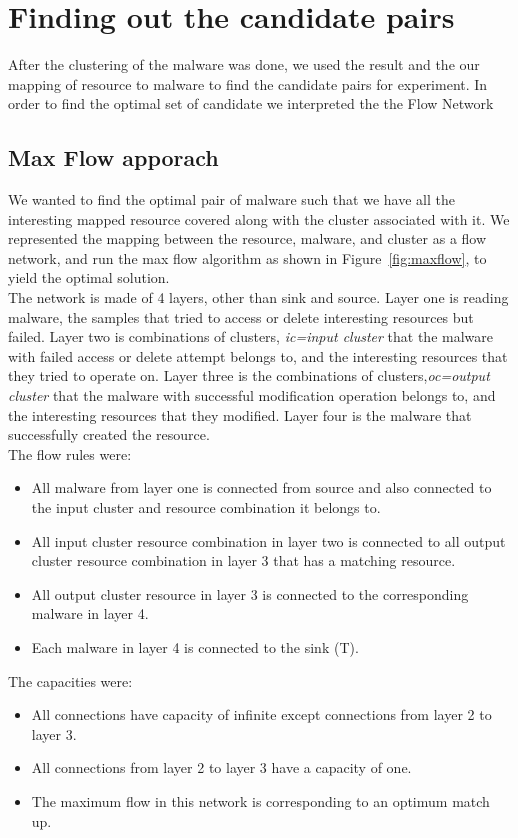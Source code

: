 \section{Finding out the candidate pairs}
\label{sec:Finding out the candidate pairs}
After the clustering of the malware was done, we used the result and the our mapping of resource to malware to find the candidate pairs for experiment.
In order to find the optimal set of candidate we interpreted the the Flow Network
\subsection{Max Flow apporach}
\label{sub:Max Flow apporach}
We wanted to find the optimal pair of malware such that we have all the interesting mapped resource covered along with the cluster associated with it.
We represented the mapping between the resource, malware, and cluster as a flow network, and run the max flow algorithm as shown in Figure~\ref{fig:maxflow}, to yield the optimal solution.\\
The network is made of 4 layers, other than sink and source. Layer one is reading malware, the samples that tried to access or delete interesting resources but failed.
Layer two is combinations of clusters, \emph{ic=input cluster} that the malware with failed access or delete attempt belongs to, and the interesting resources that they tried to operate on.
Layer three is the combinations of clusters,\emph{oc=output cluster} that the malware with successful modification operation belongs to, and the interesting resources that they modified.
Layer four is the malware that successfully created the resource.\\
The flow rules were:
\begin{itemize}
  \item All malware from layer one is connected from source and also connected to the input cluster and resource combination it belongs to.
  \item All input cluster resource combination in layer two is connected to all output cluster resource combination in layer 3 that has a matching resource.
  \item All output cluster resource in layer 3 is connected to the corresponding malware in layer 4.
  \item Each malware in layer 4 is connected to the sink (T).
\end{itemize}
The capacities were:
\begin{itemize}
  \item All connections have capacity of infinite except connections from layer 2 to layer 3.
  \item All connections from layer 2 to layer 3 have a capacity of one.
  \item The maximum flow in this network is corresponding to an optimum match up.
\end{itemize}
